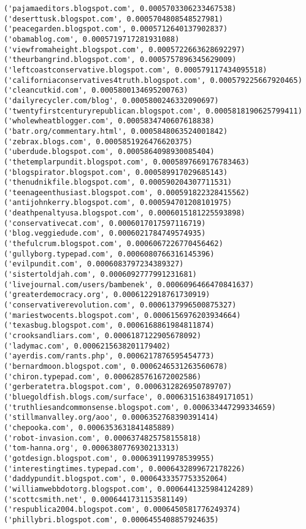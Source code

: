 \documentclass[11pt]{article}
\begin{document}
\begin{Verbatim}[commandchars=\\\{\}]
('pajamaeditors.blogspot.com', 0.0005703306233467538)
('deserttusk.blogspot.com', 0.0005704808548527981)
('peacegarden.blogspot.com', 0.0005712640137902837)
('obamablog.com', 0.0005719717281931088)
('viewfromaheight.blogspot.com', 0.0005722663628692297)
('theurbangrind.blogspot.com', 0.0005757896345629009)
('leftcoastconservative.blogspot.com', 0.000579117434095518)
('californiaconservatives4truth.blogspot.com', 0.000579225667920465)
('cleancutkid.com', 0.0005800134695200763)
('dailyrecycler.com/blog', 0.0005800246332090697)
('twentyfirstcenturyrepublican.blogspot.com', 0.0005818190625799411)
('wholewheatblogger.com', 0.0005834740607618838)
('batr.org/commentary.html', 0.0005848063524001842)
('zebrax.blogs.com', 0.0005851926476620375)
('uberdude.blogspot.com', 0.0005864098930085404)
('thetemplarpundit.blogspot.com', 0.0005897669176783463)
('blogspirator.blogspot.com', 0.000589917029685143)
('thenudnikfile.blogspot.com', 0.000590204307711531)
('teenageenthusiast.blogspot.com', 0.000591822328415562)
('antijohnkerry.blogspot.com', 0.000594701208101975)
('deathpenaltyusa.blogspot.com', 0.0006015181225593898)
('conservativecat.com', 0.0006017017597116719)
('blog.veggiedude.com', 0.0006021784749574935)
('thefulcrum.blogspot.com', 0.0006067226770456462)
('gullyborg.typepad.com', 0.0006080766316145396)
('evilpundit.com', 0.0006083797234389327)
('sistertoldjah.com', 0.0006092777991231681)
('livejournal.com/users/bambenek', 0.0006096466470841637)
('greaterdemocracy.org', 0.0006122918761730919)
('conservativerevolution.com', 0.0006137996500875327)
('mariestwocents.blogspot.com', 0.0006156976203934664)
('texasbug.blogspot.com', 0.0006168861984811874)
('crooksandliars.com', 0.0006187122905678092)
('ladymac.com', 0.0006215638201179402)
('ayerdis.com/rants.php', 0.0006217876595454773)
('bernardmoon.blogspot.com', 0.0006246531263560678)
('chiron.typepad.com', 0.0006285761672002586)
('gerberatetra.blogspot.com', 0.0006312826950789707)
('bluegoldfish.blogs.com/surface', 0.0006315163849171051)
('truthliesandcommonsense.blogspot.com', 0.000633447299334659)
('stillmanvalley.org/aoo', 0.0006352768390391414)
('chepooka.com', 0.0006353631841485889)
('robot-invasion.com', 0.0006374825758155818)
('tom-hanna.org', 0.0006380776930213313)
('gotdesign.blogspot.com', 0.000639119978539955)
('interestingtimes.typepad.com', 0.0006432899672178226)
('daddypundit.blogspot.com', 0.0006433357753352064)
('williamwebbdotorg.blogspot.com', 0.0006441325984124289)
('scottcsmith.net', 0.0006441731153581149)
('respublica2004.blogspot.com', 0.0006450581776249374)
('phillybri.blogspot.com', 0.0006455408857924635)

\end{Verbatim}
\end{document}
